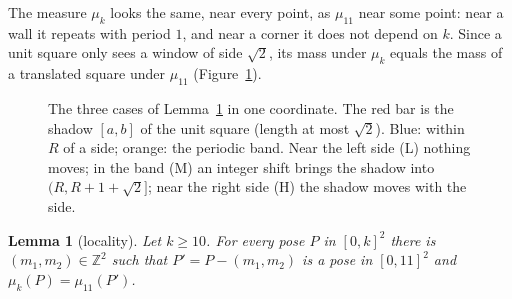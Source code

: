 \documentclass[11pt]{amsart}
\newtheorem{lemma}[theorem]{Lemma}
\theoremstyle{definition}
\theoremstyle{remark}
\newcommand{\Z}{\mathbb Z}
\begin{document}
The measure $\mu_k$ looks the same, near every point, as $\mu_{11}$ near some point: near a wall it repeats with
period $1$, and near a corner it does not depend on $k$. Since a unit square only sees a window of side $\sqrt2$, its
mass under $\mu_k$ equals the mass of a translated square under $\mu_{11}$ (Figure~\ref{fig:locality}).

\begin{figure}[ht]
\centering
\caption{The three cases of Lemma~\ref{lem:local} in one coordinate. The red bar is the shadow $[a,b]$ of the unit
square (length at most $\sqrt2$). Blue: within $R$ of a side; orange: the periodic band. Near the left side (L)
nothing moves; in the band (M) an integer shift brings the shadow into $(R,R+1+\sqrt2]$; near the right side (H) the
shadow moves with the side.}
\label{fig:locality}
\end{figure}

\begin{lemma}[locality]\label{lem:local}
Let $k\ge10$. For every pose $P$ in $[0,k]^2$ there is $(m_1,m_2)\in\Z^2$ such that $P'=P-(m_1,m_2)$ is a pose in
$[0,11]^2$ and $\mu_k(P)=\mu_{11}(P')$.
\end{lemma}
\end{document}
